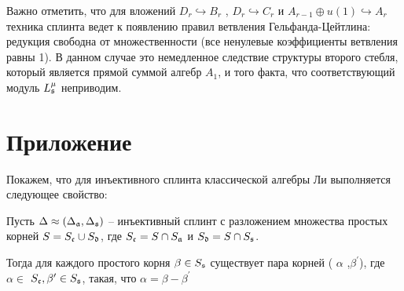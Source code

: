 Важно отметить, что для вложений  $D_{r}\hookrightarrow B_{r}$ , $D_{r}\hookrightarrow C_{r}$ и $A_{r-1}\oplus u\left( 1\right) \hookrightarrow A_{r}$ техника сплинта ведет к появлению правил ветвления Гельфанда-Цейтлина: редукция свободна от множественности (все ненулевые коэффициенты ветвления равны 1). В данном случае это немедленное следствие структуры второго стебля, который является прямой суммой алгебр $A_{1}$, и того факта, что соответствующий модуль $L_{\mathfrak{s}}^{\mu }$ неприводим.




\section*{Приложение}
\label{sec:appendix}
Покажем, что для инъективного сплинта классической алгебры Ли выполняется следующее свойство:
\begin{Prop}
Пусть $\Delta \approx (\Delta _{\mathfrak{a}},\Delta _{\mathfrak{s}})$ -- инъективный сплинт с разложением множества простых корней  $S=S_{\frak{c}}\cup S_{\frak{d}}$, где $S_{\frak{c}}=S\cap S_{\mathfrak{a}}$ и $S_{\frak{d}}=S\cap S_{\mathfrak{s}}$.

Тогда для каждого простого корня  $\beta \in S_{\mathfrak{s}}$ существует пара корней  ( $\alpha $ ,$\beta ^{\prime }$), где $\alpha \in $ $S_{\frak{c}},\beta ^{\prime }\in S_{\mathfrak{s}}$, такая, что $\alpha =\beta-\beta ^{\prime }$
\end{Prop}
